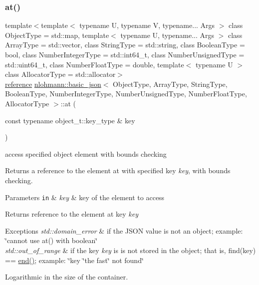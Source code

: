 \subsubsection{\texorpdfstring{at()}{at()}\hspace{0.1cm}{\footnotesize\ttfamily [3/6]}}
{\footnotesize\ttfamily template$<$template$<$ typename U, typename V, typename... Args $>$ class Object\+Type = std\+::map, template$<$ typename U, typename... Args $>$ class Array\+Type = std\+::vector, class String\+Type  = std\+::string, class Boolean\+Type  = bool, class Number\+Integer\+Type  = std\+::int64\+\_\+t, class Number\+Unsigned\+Type  = std\+::uint64\+\_\+t, class Number\+Float\+Type  = double, template$<$ typename U $>$ class Allocator\+Type = std\+::allocator$>$ \\
\hyperlink{classnlohmann_1_1basic__json_a3ec8e17be8732fe436e9d6733f52b7a3}{reference} \hyperlink{classnlohmann_1_1basic__json}{nlohmann\+::basic\+\_\+json}$<$ Object\+Type, Array\+Type, String\+Type, Boolean\+Type, Number\+Integer\+Type, Number\+Unsigned\+Type, Number\+Float\+Type, Allocator\+Type $>$\+::at (\begin{DoxyParamCaption}\item[{const typename object\+\_\+t\+::key\+\_\+type \&}]{key }\end{DoxyParamCaption})\hspace{0.3cm}{\ttfamily [inline]}}



access specified object element with bounds checking 

Returns a reference to the element at with specified key {\itshape key}, with bounds checking.


\begin{DoxyParams}[1]{Parameters}
\mbox{\tt in}  & {\em key} & key of the element to access\\
\hline
\end{DoxyParams}
\begin{DoxyReturn}{Returns}
reference to the element at key {\itshape key} 
\end{DoxyReturn}

\begin{DoxyExceptions}{Exceptions}
{\em std\+::domain\+\_\+error} & if the J\+S\+ON value is not an object; example\+: {\ttfamily \char`\"{}cannot use at() with boolean\char`\"{}} \\
\hline
{\em std\+::out\+\_\+of\+\_\+range} & if the key {\itshape key} is is not stored in the object; that is, {\ttfamily find(key) == \hyperlink{classnlohmann_1_1basic__json_a12ccf14d39ddae52f6c7e126105a230b}{end()}}; example\+: {\ttfamily \char`\"{}key \char`\"{}the fast\char`\"{} not found\char`\"{}}\\
\hline
\end{DoxyExceptions}
Logarithmic in the size of the container.

